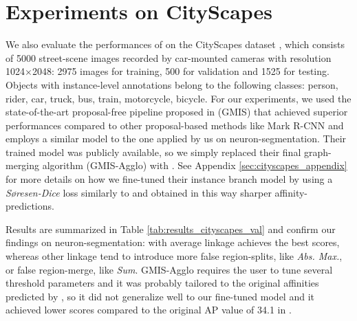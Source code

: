 \section{Experiments on CityScapes}\label{sec:cityscapes_exp}
We also evaluate the performances of \algname{} on the CityScapes dataset \cite{cordts2016cityscapes}, which consists of 5000 street-scene images recorded by car-mounted cameras with resolution 1024$\times$2048: 2975 images for training, 500 for validation and 1525 for testing. Objects with instance-level annotations belong to the following classes: person, rider, car, truck, bus, train, motorcycle, bicycle. For our experiments, we used the state-of-the-art proposal-free pipeline proposed in \cite{liu2018affinity} (GMIS) that achieved superior performances compared to other proposal-based methods like Mark R-CNN and employs a similar model to the one applied by us on neuron-segmentation.
Their trained model was publicly available, so we simply replaced their final graph-merging algorithm (GMIS-Agglo) with \algname{}. See Appendix \ref{sec:cityscapes_appendix} for more details on how we fine-tuned their instance branch model by using a \emph{S\o resen-Dice} loss similarly to \cite{wolf2018mutex} and obtained in this way sharper affinity-predictions.

Results are summarized in Table \ref{tab:results_cityscapes_val} and confirm our findings on neuron-segmentation: \algname{} with average linkage achieves the best scores, whereas other linkage tend to introduce more false region-splits, like \emph{Abs. Max.}, or false region-merge, like \emph{Sum}. GMIS-Agglo requires the user to tune several threshold parameters and it was probably tailored to the original affinities predicted by \cite{liu2018affinity}, so it did not generalize well to our fine-tuned model and it achieved lower scores compared to the original AP value of 34.1 in \cite{liu2018affinity}.  





